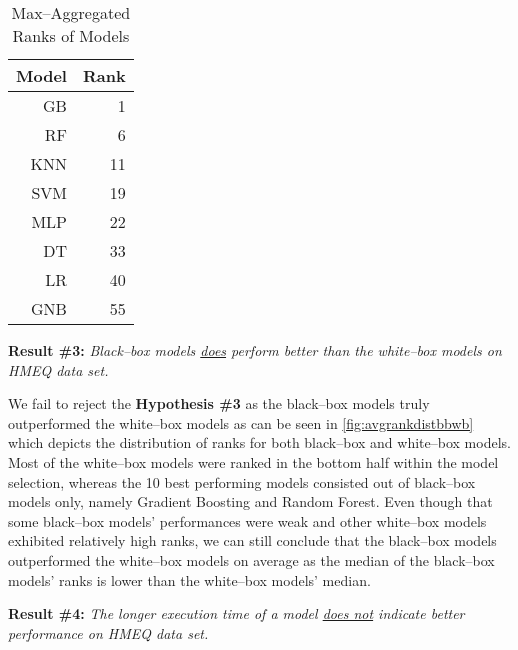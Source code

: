 \begin{table}[H]
    \small
    \setlength{\tabcolsep}{8pt}
    \renewcommand{\arraystretch}{1.3}
    \centering
        \caption[Max--Aggregated Ranks of Models]{Max--Aggregated Ranks of Models}\label{tab:maxranks}
        \begin{tabular}{r r}
    \toprule
    \textbf{Model} & \textbf{Rank}\\
    \midrule
    \hline
    GB & 1 \\ 
    RF & 6 \\ 
    KNN & 11 \\ 
    SVM & 19 \\ 
    MLP & 22 \\ 
    DT & 33 \\ 
    LR & 40 \\
    GNB & 55 \\
    \hline
    \bottomrule
    \end{tabular}
    \vspace{0.35em}

        \vspace{-1em}
\end{table}

\vspace{0.3cm}

\noindent \textbf{Result \#3:} \textit{Black--box models \underline{does} perform better than the white--box models on HMEQ data set.}

We fail to reject the \textbf{Hypothesis \#3} as the black--box models truly outperformed the white--box models as can be seen in \autoref{fig:avgrankdistbbwb} which depicts the distribution of ranks for both black--box and white--box models.
Most of the white--box models were ranked in the bottom half within the model selection, whereas the 10 best performing models consisted out of black--box models only, namely Gradient Boosting and Random Forest.
Even though that some black--box models' performances were weak and other white--box models exhibited relatively high ranks, we can still conclude that the black--box models outperformed the white--box models on average as the median of the black--box models' ranks is lower than the white--box models' median.
\vspace{0.3cm}

\noindent \textbf{Result \#4:} \textit{The longer execution time of a model \underline{does not} indicate better performance on HMEQ data set.}

